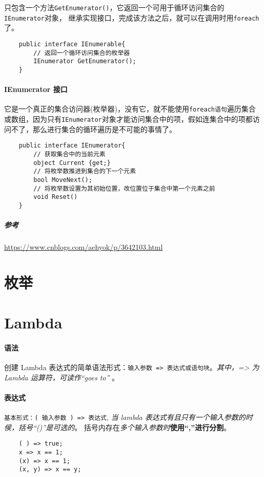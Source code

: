 \documentclass[UTF8,a4paper,12pt]{ctexbook}
\begin{document}
			只包含一个方法\verb|GetEnumerator()|，它返回一个可用于循环访问集合的\verb|IEnumerator|对象，
			继承实现接口，完成该方法之后，就可以在调用时用\verb|foreach|了。
		
			\begin{lstlisting}
	public interface IEnumerable{
		// 返回一个循环访问集合的枚举器
		IEnumerator GetEnumerator();
	}
			\end{lstlisting}
		\paragraph{IEnumerator 接口} 
			
			它是一个真正的集合访问器(枚举器)，没有它，就不能使用\verb|foreach语句|遍历集合或数组，因为只有\verb|IEnumerator|对象才能访问集合中的项，假如连集合中的项都访问不了，那么进行集合的循环遍历是不可能的事情了。
			
			\begin{lstlisting}
	public interface IEnumerator{
		// 获取集合中的当前元素
		object Current {get;}
		// 将枚举数推进到集合的下一个元素
		bool MoveNext();
		// 将枚举数设置为其初始位置，改位置位于集合中第一个元素之前
		void Reset()
	}
			\end{lstlisting}
			
			\subparagraph{参考}\url{https://www.cnblogs.com/aehyok/p/3642103.html}
				
			
	\section{枚举}
	
	\section{Lambda}
		\paragraph{语法}
			创建 Lambda 表达式的简单语法形式：\verb|输入参数 => 表达式或语句块|。\textit{其中，=> 为 Lambda 运算符，可读作“goes to” }。
		
		\paragraph{表达式}
			\verb|基本形式：( 输入参数 ) => 表达式|, \textit{当 lambda 表达式有且只有一个输入参数的时侯，括号“()”是可选的}。 括号内存在\textit{多个输入参数时}\textbf{使用“,”进行分割}。
			\begin{lstlisting}
	( ) => true;
	x => x == 1;
	(x) => x == 1; 
	(x, y) => x == y;	
			\end{lstlisting}
		
\end{document}
